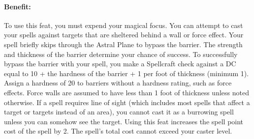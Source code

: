 \paragraph{Benefit:} To use this feat, you must expend your magical focus. 
You can attempt to cast your spells against targets that are sheltered behind a wall or force effect. 
Your spell briefly skips through the Astral Plane to bypass the barrier.
The strength and thickness of the barrier determine your chance of success. 
To successfully bypass the barrier with your spell, 
you make a Spellcraft check against a DC equal to 10 + the hardness of the barrier + 1 per foot of thickness (minimum 1). 
Assign a hardness of 20 to barriers without a hardness rating, such as force effects. 
Force walls are assumed to have less than 1 foot of thickness unless noted otherwise.
If a spell requires line of sight (which includes most spells that affect a target or targets instead of an area), 
you cannot cast it as a burrowing spell unless you can somehow see the target.%
Using this feat increases the spell point cost of the spell by 2. The spell's total cost cannot exceed your caster level.

% 
% 
% 
% 
